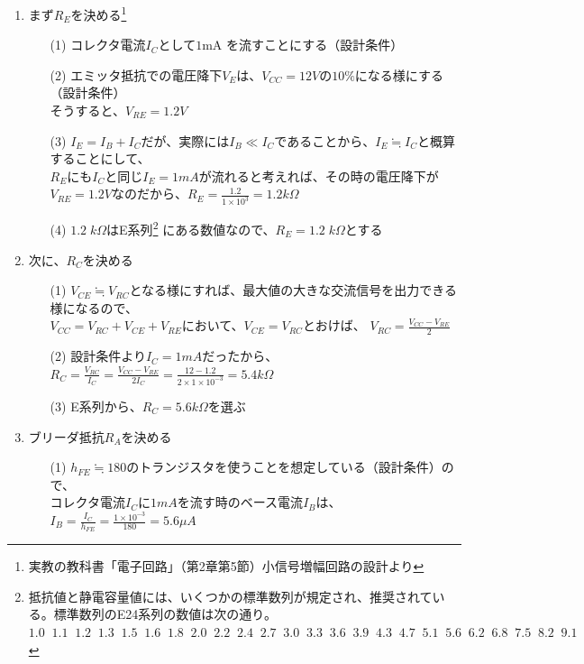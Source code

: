 \documentclass[uplatex,a4paper,11pt,oneside,openany]{jsbook}
\begin{document}
\begin{enumerate}
\item まず$R_E$を決める\footnote{実教の教科書「電子回路」（第2章第5節）小信号増幅回路の設計より}
\begin{enumerate}
\item[(1)] コレクタ電流$I_C$として$1$mA を流すことにする（設計条件）
\item[(2)] エミッタ抵抗での電圧降下$V_E$は、$V_{CC}=12V$の$10\%$になる様にする（設計条件）\\そうすると、$V_{RE}=1.2V$
\item[(3)] $I_E=I_B+I_C$だが、実際には$I_B\ll I_C$であることから、$I_E\fallingdotseq I_C$と概算することにして、\\
$R_E$にも$I_C$と同じ$I_E=1mA$が流れると考えれば、その時の電圧降下が$V_{RE}=1.2V$なのだから、$R_E=\displaystyle\frac{1.2}{1\times 10^3}=1.2k\Omega$
\item[(4)] $1.2\;k\Omega$はE系列\footnote{抵抗値と静電容量値には、いくつかの標準数列が規定され、推奨されている。標準数列のE24系列の数値は次の通り。\\
$1.0\;\;1.1\;\;1.2\;\;1.3\;\;1.5\;\;1.6\;\;1.8\;\;2.0\;\;2.2\;\;2.4\;\;2.7\;\;3.0\;\;3.3\;\;3.6\;\;3.9\;\;4.3\;\;4.7\;\;5.1\;\;5.6\;\;6.2\;\;6.8\;\;7.5\;\;8.2\;\;9.1$}
にある数値なので、$R_E=1.2\;k\Omega$とする
\end{enumerate}
\vfill
\item 次に、$R_C$を決める
\begin{enumerate}
\item[(1)] $V_{CE}\fallingdotseq V_{RC}$となる様にすれば、最大値の大きな交流信号を出力できる様になるので、\\
$V_{CC}=V_{RC}+V_{CE}+V_{RE}$において、$V_{CE}=V_{RC}$とおけば、
$V_{RC}=\displaystyle\frac{V_{CC}-V_{RE}}{2}$
\item[(2)] 設計条件より$I_C=1mA$だったから、$R_C=\displaystyle\frac{V_{RC}}{I_C}=\frac{V_{CC}-V_{RE}}{2I_C}=\frac{12-1.2}{2\times 1\times 10^{-3}}=5.4k\Omega$
\item[(3)] E系列から、$R_C=5.6k\Omega$を選ぶ
\end{enumerate}
\vfill
\item ブリーダ抵抗$R_A$を決める
\begin{enumerate}
\item[(1)] $h_{FE}\fallingdotseq 180$のトランジスタを使うことを想定している（設計条件）ので、\\
コレクタ電流$I_C$に$1mA$を流す時のベース電流$I_B$は、
$I_B=\displaystyle\frac{I_C}{h_{FE}}=\frac{1\times 10^{-3}}{180}=5.6\mu A$

\end{enumerate}
\end{enumerate}
\end{document}
